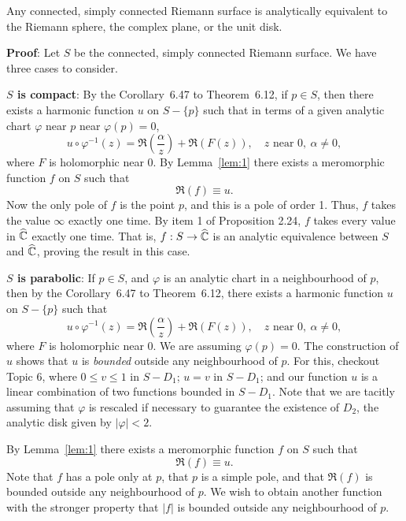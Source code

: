 \documentclass[a4paper,11pt]{article}
\begin{document}
\begin{thm}
  Any connected, simply connected Riemann surface is analytically
  equivalent to the Riemann sphere, the complex plane, or the unit
  disk.
\end{thm}

\begin{mdframed}[skipbelow=1ex]
  \textbf{Proof}:
  Let $S$ be the connected, simply connected Riemann surface.  We have
  three cases to consider.

  \textbf{$S$ is compact}:  By the Corollary~6.47 to Theorem~6.12, if
  $p \in S$, then there exists a harmonic function $u$ on $S - \{p\}$
  such that in terms of a given analytic chart $\varphi$ near $p$ near
  $\varphi(p) = 0$,
  $$
  u \circ \varphi^{-1}(z) = \Re(\frac{\alpha}{z}) + \Re(F(z)),\quad
  z \text{ near } 0,\ \alpha \ne 0,
  $$
  where $F$ is holomorphic near 0.  By Lemma~\ref{lem:1} there exists
  a meromorphic function $f$ on $S$ such that
  $$
  \Re(f) \equiv u.
  $$
  Now the only pole of $f$ is the point $p$, and this is a pole of
  order 1.  Thus, $f$ takes the value $\infty$ exactly one time.  By
  item 1 of Proposition 2.24, $f$ takes every value in
  $\widehat{{\mathbb C}}$ exactly one time.  That is, $f : S \to
  \widehat{{\mathbb C}}$ is an analytic equivalence between $S$ and
  $\widehat{{\mathbb C}}$, proving the result in this case. 

  \textbf{$S$ is parabolic}: If $p \in S$, and $\varphi$ is an
  analytic chart in a neighbourhood of $p$, then by the Corollary~6.47
  to Theorem~6.12, there exists a harmonic function $u$ on $S - \{p\}$
  such that
  $$
  u \circ \varphi^{-1}(z) = \Re(\frac{\alpha}{z}) + \Re(F(z)),\quad
  z \text{ near } 0,\ \alpha \ne 0,
  $$
  where $F$ is holomorphic near 0.  We are assuming $\varphi(p) = 0$.
  The construction of $u$ shows that $u$ is \emph{bounded} outside any
  neighbourhood of $p$.  For this, checkout Topic 6, where $0 \le v
  \le 1$ in $S-D_1$; $u = v$ in $S-D_1$; and our function $u$ is a
  linear combination of two functions bounded in $S-D_1$.  Note that
  we are tacitly assuming that $\varphi$ is rescaled if necessary to
  guarantee the existence of $D_2$, the analytic disk given by
  $|\varphi| < 2$.

  By Lemma~\ref{lem:1} there exists a meromorphic function $f$ on $S$
  such that
  $$
  \Re(f) \equiv u.
  $$
  Note that $f$ has a pole only at $p$, that $p$ is a simple pole, and
  that $\Re(f)$ is bounded outside any neighbourhood of $p$.  We wish
  to obtain another function with the stronger property that $|f|$ is
  bounded outside any neighbourhood of $p$.


\end{mdframed}
\end{document}
